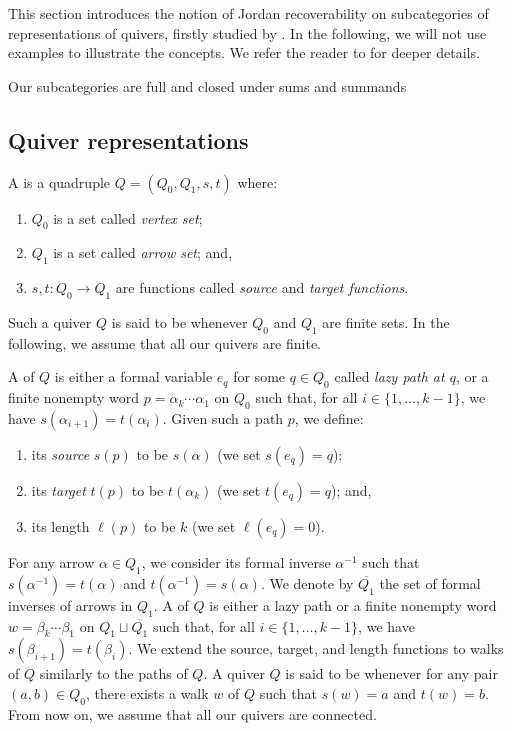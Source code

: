 \pagestyle{plain}

This section introduces the notion of Jordan recoverability on subcategories of representations of quivers, firstly studied by \cite{GPT19}. In the following, we will not use examples to illustrate the concepts. We refer the reader to \cite{GPT19,D22,D23} for deeper details.

\begin{conv} \label{conv:addsubcat}
    Our subcategories are full and closed under sums and summands
\end{conv}

\subsection{Quiver representations}

A  is a quadruple $Q = (Q_0,Q_1,s,t)$ where:
\begin{enumerate}[label=$\bullet$, itemsep=1mm]
    \item $Q_0$ is a set called \emph{vertex set};
    \item $Q_1$ is a set called \emph{arrow set}; and,
    \item $s,t : Q_0 \longrightarrow Q_1$ are functions called \emph{source} and \emph{target functions}.
\end{enumerate}
Such a quiver $Q$ is said to be  whenever $Q_0$ and $Q_1$ are finite sets. In the following, we assume that all our quivers are finite.

A  of $Q$ is either a formal variable $e_q$ for some $q \in Q_0$ called \emph{lazy path at $q$}, or a finite nonempty word $p = \alpha_k \cdots \alpha_1$ on $Q_0$ such that, for all $i \in \{1,\ldots,k-1\}$, we have $s(\alpha_{i+1}) = t(\alpha_i)$. Given such a path $p$, we define:
\begin{enumerate}[label=$\bullet$, itemsep=1mm]
    \item its \emph{source} $s(p)$ to be $s(\alpha)$ (we set $s(e_q) = q$);
    \item its \emph{target} $t(p)$ to be $t(\alpha_k)$ (we set $t(e_q) = q$); and,
    \item its length $\ell(p)$ to be $k$ (we set $\ell(e_q) = 0$).
\end{enumerate}
For any arrow $\alpha \in Q_1$, we consider its formal inverse $\alpha^{-1}$ such that $s(\alpha^{-1}) = t(\alpha)$ and $t(\alpha^{-1}) = s(\alpha)$. We denote by $\overline{Q_1}$ the set of formal inverses of arrows in $Q_1$. A  of $Q$ is either a lazy path or a finite nonempty word $w = \beta_k \cdots \beta_1$ on $Q_1 \sqcup \overline{Q_1}$ such that, for all $i \in \{1,\ldots,k-1\}$, we have $s(\beta_{i+1}) = t(\beta_i)$. We extend the source, target, and length functions to walks of $Q$ similarly to the paths of $Q$. A quiver $Q$ is said to be  whenever for any pair $(a,b) \in Q_0$, there exists a walk $w$ of $Q$ such that $s(w) = a$ and $t(w)=b$. From now on, we assume that all our quivers are connected.

